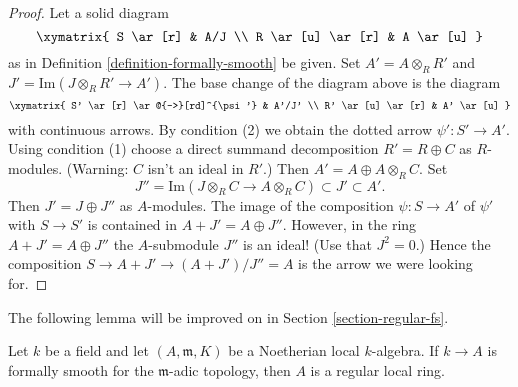 \begin{proof}
Let a solid diagram
$$
\xymatrix{
S \ar[r] & A/J \\
R \ar[u] \ar[r] & A \ar[u]
}
$$
as in Definition \ref{definition-formally-smooth} be given.
Set $A' = A \otimes_R R'$ and $J' = \text{Im}(J \otimes_R R' \to A')$.
The base change of the diagram above is the diagram
$$
\xymatrix{
S' \ar[r] \ar@{-->}[rd]^{\psi'} & A'/J' \\
R' \ar[u] \ar[r] & A' \ar[u]
}
$$
with continuous arrows. By condition (2) we obtain the dotted arrow
$\psi' : S' \to A'$. Using condition (1) choose a direct summand decomposition
$R' = R \oplus C$ as $R$-modules. (Warning: $C$ isn't an ideal in $R'$.)
Then $A' = A \oplus A \otimes_R C$. Set
$$
J'' = \text{Im}(J \otimes_R C \to A \otimes_R C) \subset J' \subset A'.
$$
Then $J' = J \oplus J''$ as $A$-modules. The image of the composition
$\psi : S \to A'$ of $\psi'$ with $S \to S'$ is contained in
$A + J' = A \oplus J''$. However, in the ring $A + J' = A \oplus J''$
the $A$-submodule $J''$ is an ideal! (Use that $J^2 = 0$.) Hence the
composition $S \to A + J' \to (A + J')/J'' = A$ is the arrow we were
looking for.
\end{proof}

\noindent
The following lemma will be improved on in
Section \ref{section-regular-fs}.

\begin{lemma}
\label{lemma-fs-implies-regular}
Let $k$ be a field and let $(A, \mathfrak m, K)$ be a Noetherian
local $k$-algebra. If $k \to A$ is formally smooth for the
$\mathfrak m$-adic topology, then $A$ is a regular local ring.
\end{lemma}

